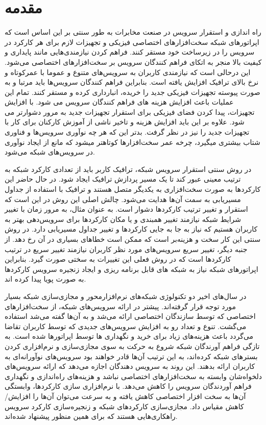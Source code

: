 \chapter{مقدمه}

راه اندازی و استقرار سرویس در صنعت مخابرات به طور سنتی بر این اساس است که اپراتورهای شبکه سخت‌افزارهای اختصاصی فیزیکی و تجهیزات لازم برای هر کارکرد در سرویس را در زیرساخت خود مستقر کنند.
فراهم کردن نیازمندی‌هایی مانند پایداری و کیفیت بالا منجر به اتکای فراهم کنندگان سرویس بر سخت‌افزارهای اختصاصی می‌شود. 
این درحالی است که نیازمندی کاربران به سرویس‌های متنوع و عموما با عمرکوتاه و نرخ بالای ترافیک افزایش یافته است.
بنابراین فراهم کنندگان سرویس‌ها باید مرتبا و به صورت پیوسته تجهیزات فیزیکی جدید را خریده، انبارداری کرده و مستقر کنند.
تمام این عملیات باعث افزایش هزینه های فراهم کنندگان سرویس می شود.
با افزایش تجهیزات، پیدا کردن فضای فیزیکی برای استقرار تجهیزات جدید به مرور دشوارتر می شود.
علاوه بر این باید افزایش هزینه و تاخیر ناشی از آموزش کارکنان برای کار با تجهیزات جدید را نیز در نظر گرفت.
بدتر این که هر چه نوآوری سرویس‌ها و فناوری شتاب بیشتری می‍گیرد، چرخه عمر سخت‌افزارها کوتاه‍تر می‍شود که مانع از ایجاد نوآوری در سرویس‌های شبکه می‌شود.

در روش سنتی استقرار سرویس شبکه، ترافیک کاربر باید از تعدادی کارکرد شبکه به ترتیب معینی عبور کند تا یک مسیر پردازش ترافیک ایجاد شود.
در حال حاضر این کارکردها به صورت سخت‌افزاری به یکدیگر متصل هستند و ترافیک با استفاده از جداول مسیریابی به سمت آن‌ها هدایت می‌شود.
چالش اصلی این روش در این است که استقرار و تغییر ترتیب کارکردها دشوار است.
به عنوان مثال، به مرور زمان با تغییر شرایط شبکه نیازمند تغییر همبندی و یا مکان کارکردها برای سرویس‌دهی بهتر به کاربران هستیم که نیاز به جا به جایی کارکردها و تغییر جداول مسیریابی دارد.
در روش سنتی این کار سخت و هزینه‌بر است که ممکن است خطاهای بسیاری در آن رخ دهد.
از جنبه دیگر، تغییر سریع سرویس‌های مورد نظر کاربران نیازمند تغییر سریع در ترتیب کارکردها است که در روش فعلی این تغییرات به سختی صورت گیرد.
بنابراین اپراتورهای شبکه نیاز به شبکه های قابل برنامه ریزی و ایجاد زنجیره سرویس کارکردها به صورت پویا پیدا کرده اند.

در سال‌های اخیر دو تکنولوژی شبکه‌های نرم‌افزارمحور و مجازی‌سازی شبکه بسیار مورد توجه قرار گرفته‌اند.
پیشتر در ارائه سرویس‌های شبکه، از سخت‌افزارهای اختصاصی که توسط سازندگان اختصاصی ارائه می‌شد و به آن‌ها
گفته می‌شد استفاده می‌گشت.
تنوع و تعداد رو به افزایش سرویس‌های جدیدی که توسط کاربران تقاضا می‌گردد
باعث هزینه‌های زیاد برای خرید و نگهداری
‌ها
توسط اپراتورها شده است.
به تازگی فراهم آورندگان شبکه
شروع به حرکت به سوی مجازی‌سازی و نرم‌افزاری کردن بسترهای شبکه کرده‌اند،
به این ترتیب آن‌ها قادر خواهند بود
سرویس‌های نوآورانه‌ای به کاربران ارائه بدهند.
این روند به سرویس دهندگان اجازه می‌دهد که ارائه سرویس‌های دلخواه‌شان وابسته به سخت‌افزارهای اختصاصی نباشد و 
هزینه‌های راه‌اندازی و نگهداری فراهم آوردندگان سرویس را کاهش می‌دهد.
با نرم‌افزاری سازی کارکردها، وابستگی آن‌ها به سخت افزار اختصاصی کاهش یافته و به سرعت می‌توان آن‌ها را افزایش/کاهش مقیاس داد.
مجازی‌سازی کارکردهای شبکه و زنجیره‌سازی کارکرد سرویس‌ راهکاری‌هایی هستند که برای همین منظور پیشنهاد شده‌اند.

